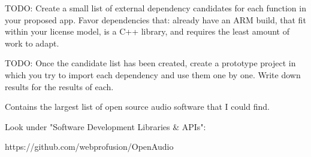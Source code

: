 TODO: Create a small list of external dependency candidates for each function in your proposed app. Favor dependencies that: already have an ARM build, that fit within your license model, is a C++ library, and requires the least amount of work to adapt.

TODO: Once the candidate list has been created, create a prototype project in which you try to import each dependency and use them one by one. Write down results for the results of each.



Contains the largest list of open source audio software that I could find. 

Look under "Software Development Libraries \& APIs":

https://github.com/webprofusion/OpenAudio